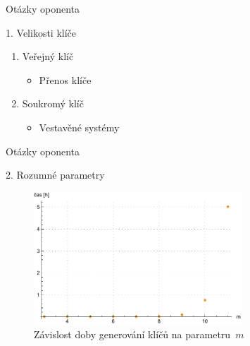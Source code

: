 \documentclass{beamer}
\begin{document}
\begin{frame}{Otázky oponenta}

    \begin{block}{1. Velikosti klíče}
        \begin{enumerate}

            \item Veřejný klíč
                \begin{itemize}
                    \item Přenos klíče
                \end{itemize}

            \item Soukromý klíč
                \begin{itemize}
                    \item Vestavěné systémy
                \end{itemize}

        \end{enumerate}
    \end{block}

\end{frame}

\begin{frame}{Otázky oponenta}
    \begin{block}{2. Rozumné parametry}

        \begin{figure}
            \centering
            \includegraphics[width=0.7\textwidth]{../../implementace/grafy/listplot_mVelka_generovani.pdf}
            \caption[Časová složitost generování klíčů]{
                Závislost doby generování klíčů na parametru~$m$
            }
        \end{figure}

    \end{block}
\end{frame}
\end{document}
